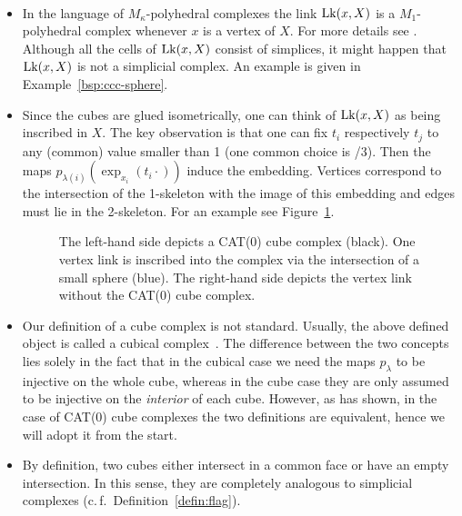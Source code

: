 \begin{rem}
  \label{rem:complex}~
  \vspace{-6pt}
  \begin{itemize}
  \item In the language of \(M_\kappa\)-polyhedral complexes the link \(\operatorname{Lk}(x, X)\) is a \(M_1\)-polyhedral complex whenever \(x\) is a vertex of \(X\). For more details see \textcite[Section~I.7]{MR1744486}. Although all the cells of \(\operatorname{Lk}(x,X)\) consist of simplices, it might happen that \(\operatorname{Lk}(x,X)\) is not a simplicial complex. An example is given in Example~\ref{bsp:ccc-sphere}. 
  \item Since the cubes are glued isometrically, one can think of \(\operatorname{Lk}(x,X)\) as being inscribed in \(X\). The key observation is that one can fix \(t_i\) respectively \(t_j\) to any (common) value smaller than 1 (one common choice is {/3}). Then the maps \(p_{\lambda(i)}(\exp_{x_i}(t_i \cdot))\) induce the embedding. Vertices correspond to the intersection of the 1-skeleton with the image of this embedding and edges must lie in the 2-skeleton. For an example see Figure~\ref{fig:link}.
    \begin{figure}[htbp]
      \centering
      
      \caption{The left-hand side depicts a CAT(0) cube complex (black). One vertex link is inscribed into the complex via the intersection of a small sphere (blue). The right-hand side depicts the vertex link without the CAT(0) cube complex.}
      \label{fig:link}
    \end{figure}
  \item Our definition of a cube complex is not standard. Usually, the above defined object is called a cubical complex\ \cite[c.\,f.][Def.~I.7.37]{MR1744486}. The difference between the two concepts lies solely in the fact that in the cubical case we need the maps \(p_\lambda\) to be injective on the whole cube, whereas in the cube case they are only assumed to be injective on the \emph{interior} of each cube. However, as \textcite[Thm.~C.4]{MR3029427} has shown, in the case of CAT(0) cube complexes the two definitions are equivalent, hence we will adopt it from the start.
  \item By definition, two cubes either intersect in a common face or have an empty intersection. In this sense, they are completely analogous to simplicial complexes (c.\,f.\ Definition~\ref{defin:flag}). 
  \end{itemize}
\end{rem}

